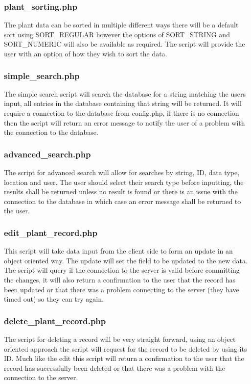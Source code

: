 	\subsubsection{plant\_sorting.php}
		The plant data can be sorted in multiple different ways there will be a default sort using SORT\_REGULAR however the options of SORT\_STRING and SORT\_NUMERIC will also be available as required. The script will provide the user with an option of how they wish to sort the data.

	\subsubsection{simple\_search.php}
		The simple search script will search the database for a string matching the users input, all entries in the database containing that string will be returned. It will require a connection to the database from config.php, if there is no connection then the script will return an error message to notify the user of a problem with the connection to the database.

	\subsubsection{advanced\_search.php}
		The script for advanced search will allow for searches by string, ID, data type, location and user. The user should select their search type before inputting, the results shall be returned unless no result is found or there is an issue with the connection to the database in which case an error message shall be returned to the user. 

	\subsubsection{edit\_plant\_record.php}
		This script will take data input from the client side to form an update in an object oriented way. The update will set the field to be updated to the new data. The script will query if the connection to the server is valid before committing the changes, it will also return a confirmation to the user that the record has been updated or that there was a problem connecting to the server (they have timed out) so they can try again.

	\subsubsection{delete\_plant\_record.php}
		The script for deleting a record will be very straight forward, using an object oriented approach the script will request for the record to be deleted by using its ID. Much like the edit this script will return a confirmation to the user that the record has successfully been deleted or that there was a problem with the connection to the server.

